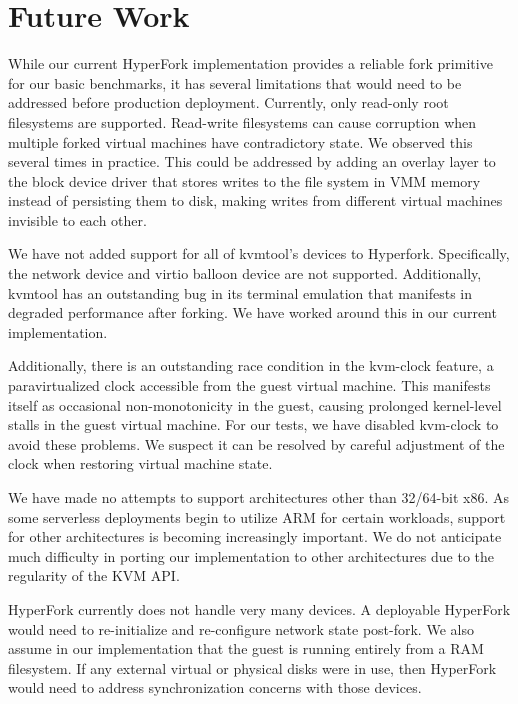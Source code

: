 \section{Future Work} \label{sec:future}

 While our current HyperFork implementation
provides a reliable fork primitive for our basic benchmarks, it has several
limitations that would need to be addressed before production deployment.
Currently, only read-only root filesystems are supported. Read-write
filesystems can cause corruption when multiple forked virtual machines have
contradictory state. We observed this several times in practice. This could be
addressed by adding an overlay layer to the block device driver that stores
writes to the file system in VMM memory instead of persisting them to disk,
making writes from different virtual machines invisible to each other.

We have not added support for all of kvmtool's devices to Hyperfork.
Specifically, the network device and virtio balloon device are not
supported. Additionally, kvmtool has an outstanding bug in its terminal
emulation that manifests in degraded performance after forking. We have worked
around this in our current implementation.

Additionally, there is an outstanding race condition in the kvm-clock feature,
a paravirtualized clock accessible from the guest virtual machine. This
manifests itself as occasional non-monotonicity in the guest, causing prolonged
kernel-level stalls in the guest virtual machine. For our tests, we have
disabled kvm-clock to avoid these problems. We suspect it can be resolved by
careful adjustment of the clock when restoring virtual machine state.

We have made no attempts to support architectures other than 32/64-bit x86. As
some serverless deployments begin to utilize ARM for certain workloads, support
for other architectures is becoming increasingly important. We do not
anticipate much difficulty in porting our implementation to other architectures
due to the regularity of the KVM API.


HyperFork currently does not handle very many devices. A deployable HyperFork
would need to re-initialize and re-configure network state post-fork. We also
assume in our implementation that the guest is running entirely from a RAM
filesystem. If any external virtual or physical disks were in use, then
HyperFork would need to address synchronization concerns with those devices.

